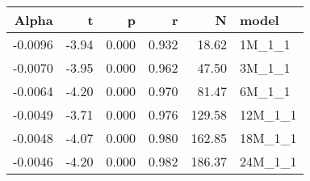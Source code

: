 \begin{table}[ht]
\centering
\begin{tabular}{rrrrrl}
  \hline
Alpha & t & p & r & N & model \\ 
  \hline
-0.0096 & -3.94 & 0.000 & 0.932 & 18.62 & 1M\_1\_1 \\ 
  -0.0070 & -3.95 & 0.000 & 0.962 & 47.50 & 3M\_1\_1 \\ 
  -0.0064 & -4.20 & 0.000 & 0.970 & 81.47 & 6M\_1\_1 \\ 
  -0.0049 & -3.71 & 0.000 & 0.976 & 129.58 & 12M\_1\_1 \\ 
  -0.0048 & -4.07 & 0.000 & 0.980 & 162.85 & 18M\_1\_1 \\ 
  -0.0046 & -4.20 & 0.000 & 0.982 & 186.37 & 24M\_1\_1 \\ 
   \hline
\end{tabular}
\end{table}

